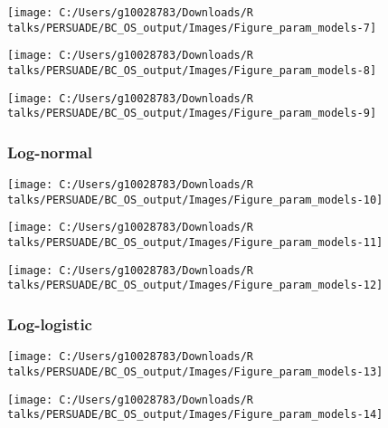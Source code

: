\documentclass[
]{article}
\begin{document}
\begin{flushleft}\texttt{[image: C:/Users/g10028783/Downloads/R talks/PERSUADE/BC\_OS\_output/Images/Figure\_param\_models-7]} \end{flushleft}

\begin{flushleft}\texttt{[image: C:/Users/g10028783/Downloads/R talks/PERSUADE/BC\_OS\_output/Images/Figure\_param\_models-8]} \end{flushleft}

\begin{flushleft}\texttt{[image: C:/Users/g10028783/Downloads/R talks/PERSUADE/BC\_OS\_output/Images/Figure\_param\_models-9]} \end{flushleft}

\clearpage

\subsubsection{Log-normal}\label{log-normal}

\begin{flushleft}\texttt{[image: C:/Users/g10028783/Downloads/R talks/PERSUADE/BC\_OS\_output/Images/Figure\_param\_models-10]} \end{flushleft}

\begin{flushleft}\texttt{[image: C:/Users/g10028783/Downloads/R talks/PERSUADE/BC\_OS\_output/Images/Figure\_param\_models-11]} \end{flushleft}

\begin{flushleft}\texttt{[image: C:/Users/g10028783/Downloads/R talks/PERSUADE/BC\_OS\_output/Images/Figure\_param\_models-12]} \end{flushleft}

\clearpage

\subsubsection{Log-logistic}\label{log-logistic}

\begin{flushleft}\texttt{[image: C:/Users/g10028783/Downloads/R talks/PERSUADE/BC\_OS\_output/Images/Figure\_param\_models-13]} \end{flushleft}

\begin{flushleft}\texttt{[image: C:/Users/g10028783/Downloads/R talks/PERSUADE/BC\_OS\_output/Images/Figure\_param\_models-14]} \end{flushleft}
\end{document}
